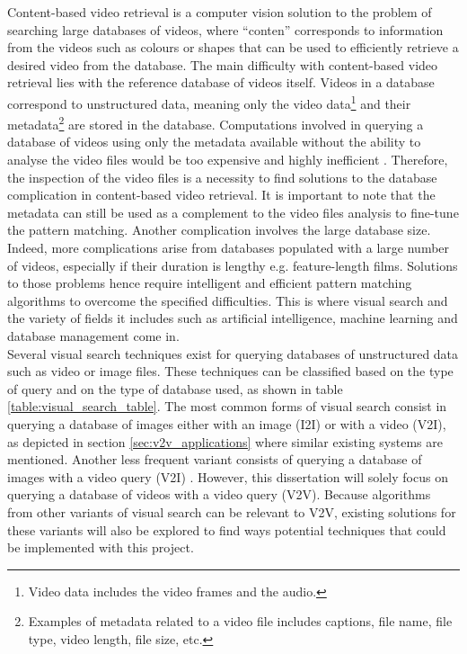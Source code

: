 Content-based video retrieval is a computer vision solution to the problem of searching large databases of videos, where ``conten'' corresponds to information from the videos such as colours or shapes that can be used to efficiently retrieve a desired video from the database. The main difficulty with content-based video retrieval lies with the reference database of videos itself. Videos in a database correspond to unstructured data, meaning only the video data\footnote{Video data includes the video frames and the audio.} and their metadata\footnote{Examples of metadata related to a video file includes captions, file name, file type, video length, file size, etc.} are stored in the database. Computations involved in querying a database of videos using only the metadata available without the ability to analyse the video files would be too expensive and highly inefficient \cite{patel2012}. Therefore, the inspection of the video files is a necessity to find solutions to the database complication in content-based video retrieval. It is important to note that the metadata can still be used as a complement to the video files analysis to fine-tune the pattern matching. Another complication involves the large database size. Indeed, more complications arise from databases populated with a large number of videos, especially if their duration is lengthy e.g. feature-length films. Solutions to those problems hence require intelligent and efficient pattern matching algorithms to overcome the specified difficulties. This is where visual search and the variety of fields it includes such as artificial intelligence, machine learning and database management come in.\\

Several visual search techniques exist for querying databases of unstructured data such as video or image files. These techniques can be classified based on the type of query and on the type of database used, as shown in table \ref{table:visual_search_table}. The most common forms of visual search consist in querying a database of images either with an image (I2I) or with a video (V2I), as depicted in section \ref{sec:v2v_applications} where similar existing systems are mentioned. Another less frequent variant consists of querying a database of images with a video query (V2I) \cite{araujo2017i2v}. However, this dissertation will solely focus on querying a database of videos with a video query (V2V). Because algorithms from other variants of visual search can be relevant to V2V, existing solutions for these variants will also be explored to find ways potential techniques that could be implemented with this project.\\

